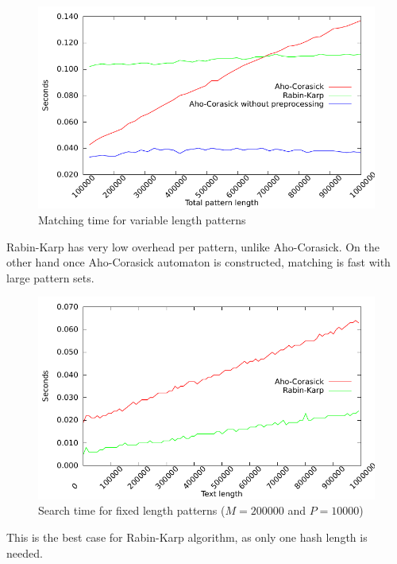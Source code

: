 \documentclass[final]{beamer}
\begin{document}
\begin{poster}
\begin{figure}
{\centering
 \includegraphics[width=25cm]{var_len.pdf}
\caption{Matching time for variable length patterns}
\label{fig:var_len}
}
\end{figure}
\begin{small} 
Rabin-Karp has very low overhead per pattern, unlike Aho-Corasick.
On the other hand once Aho-Corasick automaton is constructed,
matching is fast with large pattern sets.
\end{small}


\begin{figure}
\centering
 \includegraphics[width=25cm]{text_len_fixed.pdf}
\caption{
Search time for fixed length patterns ($M = 200000$ and $P = 10000$)
}
\label{fig:text_len_fixed}
\end{figure}
This is the best case for Rabin-Karp algorithm, as only one hash length is needed.


\end{poster}
\end{document}
